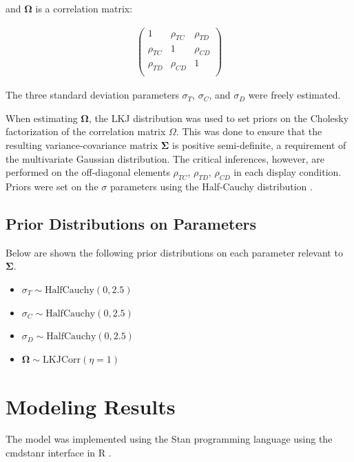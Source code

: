 and $\boldsymbol{\Omega}$ is a correlation matrix:

\begin{align}
   \begin{pmatrix}
      1 & \rho_{TC} & \rho_{TD} \\
      \rho_{TC} & 1 & \rho_{CD} \\
      \rho_{TD} & \rho_{CD} & 1 \\
   \end{pmatrix}
   \label{eqn:O_1}
\end{align}

The three standard deviation parameters $\sigma_{T}$, $\sigma_{C}$, and $\sigma_{D}$ were freely estimated.

When estimating $\boldsymbol{\Omega}$, the LKJ distribution \parencite{lewandowski2009generating} was used to set priors on the Cholesky factorization of the correlation matrix $\Omega$. This was done to ensure that the resulting variance-covariance matrix $\boldsymbol{\Sigma}$ is positive semi-definite, a requirement of the multivariate Gaussian distribution. The critical inferences, however, are performed on the off-diagonal elements $\rho_{TC}$, $\rho_{TD}$, $\rho_{CD}$ in each display condition. Priors were set on the $\sigma$ parameters using the Half-Cauchy distribution \parencite{gelman2006prior}. 

\subsection{Prior Distributions on Parameters}
Below are shown the following prior distributions on each parameter relevant to $\boldsymbol{\Sigma}$.
\begin{itemize}
    \item $\sigma_{T} \sim\mathrm{HalfCauchy}(0,2.5)$
    \item $\sigma_{C} \sim\mathrm{HalfCauchy}(0,2.5)$
    \item $\sigma_{D} \sim\mathrm{HalfCauchy}(0,2.5)$
    \item $\boldsymbol{\Omega} \sim \mathrm{LKJCorr}(\eta=1)$
\end{itemize}

\section{Modeling Results}
The model was implemented using the Stan programming language \parencite{carpenter2017stan} using the cmdstanr interface \parencite{cmdstanr} in R . 

